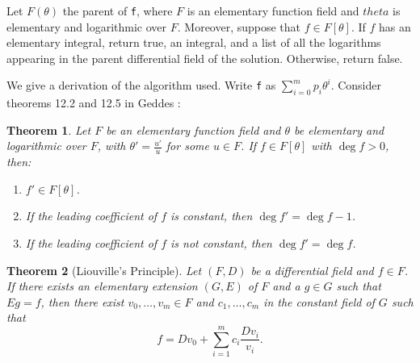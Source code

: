 \documentclass{article}
\theoremstyle{plain}
\newtheorem{theorem}{Theorem}
\theoremstyle{definition}
\begin{document}
\noindent Let $F(\theta)$ the parent of \lstinline{f}, where $F$ is an
elementary function field and $theta$ is elementary and logarithmic over $F$.
Moreover, suppose that $f \in F[\theta]$. If $f$ has an elementary integral,
return true, an integral, and a list of all the logarithms appearing in the
parent differential field of the solution. Otherwise, return false. \medbreak

We give a derivation of the algorithm used. Write \lstinline{f} as
$\sum_{i = 0}^m p_i \theta^i$. Consider theorems 12.2 and 12.5 in Geddes
\cite{geddes:afca}: \bigbreak

\begin{theorem} \label{log_poly}
    Let $F$ be an elementary function field and $\theta$ be elementary and
    logarithmic over $F$, with $\theta' = \frac {u'} u$ for some $u \in F$. If
    $f \in F[\theta]$ with $\deg f > 0$, then:
    \begin{enumerate}[label=\emph{(\roman*)}]
        \item $f' \in F[\theta]$.
        \item If the leading coefficient of $f$ is constant, then $\deg f' =
            \deg f - 1$.
        \item If the leading coefficient of $f$ is \emph{not} constant, then
            $\deg f' = \deg f$.
    \end{enumerate}
\end{theorem}

\bigbreak

\begin{theorem}[Liouville's Principle] \label{liouville}
    Let $(F, D)$ be a differential field and $f \in F$. If there exists an
    elementary extension $(G, E)$ of $F$ and a $g \in G$ such that $Eg = f$,
    then there exist $v_0, \dots, v_m \in F$ and $c_1, \dots, c_m$ in the
    constant field of $G$ such that
    \begin{equation}
        f = Dv_0 + \sum_{i = 1}^m c_i \frac {Dv_i} {v_i}.
    \end{equation}
\end{theorem}

\bigbreak
\end{document}
